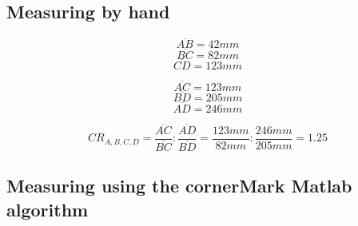 \documentclass[
a4paper,     %
12pt         %
]{scrartcl}  %
\begin{document}
\subsection{Measuring by hand}

\begin{minipage}{0.48\textwidth}
  $$\overline{AB} = 42mm$$
  $$\overline{BC} = 82mm$$
  $$\overline{CD} = 123mm$$
\end{minipage}
\begin{minipage}{0.48\textwidth}
  $$\overline{AC} = 123mm$$
  $$\overline{BD} = 205mm$$
  $$\overline{AD} = 246mm$$
\end{minipage}

\hspace{0.5mm}

$$CR_{A,B,C,D} = \frac{\overline{AC}}{\overline{BC}} : \frac{\overline{AD}}{\overline{BD}} = \frac{123mm}{82mm} : \frac{246mm}{205mm} = 1.25$$

\subsection{Measuring using the cornerMark Matlab algorithm}





% 

% 
\end{document}
